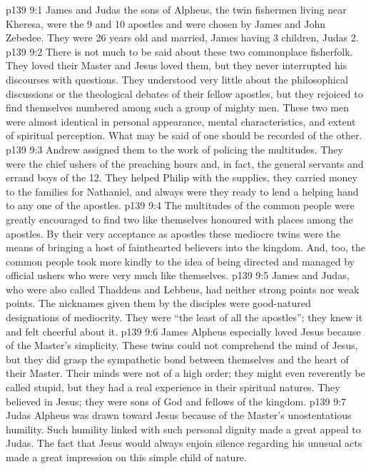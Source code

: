 \vs p139 9:1 James and Judas the sons of Alpheus, the twin fishermen living near Kheresa, were the 9 and 10 apostles and were chosen by James and John Zebedee. They were 26 years old and married, James having 3 children, Judas 2.
\vs p139 9:2 \pc There is not much to be said about these two commonplace fisherfolk. They loved their Master and Jesus loved them, but they never interrupted his discourses with questions. They understood very little about the philosophical discussions or the theological debates of their fellow apostles, but they rejoiced to find themselves numbered among such a group of mighty men. These two men were almost identical in personal appearance, mental characteristics, and extent of spiritual perception. What may be said of one should be recorded of the other.
\vs p139 9:3 Andrew assigned them to the work of policing the multitudes. They were the chief ushers of the preaching hours and, in fact, the general servants and errand boys of the 12. They helped Philip with the supplies, they carried money to the families for Nathaniel, and always were they ready to lend a helping hand to any one of the apostles.
\vs p139 9:4 The multitudes of the common people were greatly encouraged to find two like themselves honoured with places among the apostles. By their very acceptance as apostles these mediocre twins were the means of bringing a host of fainthearted believers into the kingdom. And, too, the common people took more kindly to the idea of being directed and managed by official ushers who were very much like themselves.
\vs p139 9:5 James and Judas, who were also called Thaddeus and Lebbeus, had neither strong points nor weak points. The nicknames given them by the disciples were good\hyp{}natured designations of mediocrity. They were “the least of all the apostles”; they knew it and felt cheerful about it.
\vs p139 9:6 \pc James Alpheus especially loved Jesus because of the Master’s simplicity. These twins could not comprehend the mind of Jesus, but they did grasp the sympathetic bond between themselves and the heart of their Master. Their minds were not of a high order; they might even reverently be called stupid, but they had a real experience in their spiritual natures. They believed in Jesus; they were sons of God and fellows of the kingdom.
\vs p139 9:7 Judas Alpheus was drawn toward Jesus because of the Master’s unostentatious humility. Such humility linked with such personal dignity made a great appeal to Judas. The fact that Jesus would always enjoin silence regarding his unusual acts made a great impression on this simple child of nature.
